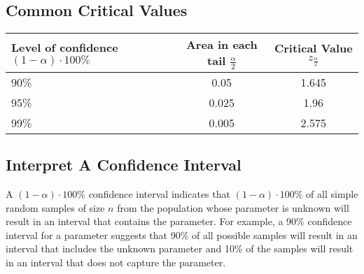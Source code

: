 \documentclass{report}
\begin{document}
        \bigbreak \noindent \bigbreak \noindent 
        \subsection*{Common Critical Values}
        \bigbreak \noindent 
                \begin{center}
            \begin{tabular}{|l|c|c|}
            \hline
            Level of confidence $(1-\alpha) \cdot 100\%$ & Area in each tail $\frac{\alpha}{2}$ & Critical Value $z_{\frac{\alpha}{2}}$ \\
            	\hline
            90\% & 0.05 & 1.645   \\
            	\hline
            95\% & 0.025 & 1.96 \\
            \hline 
            99\% & 0.005 & 2.575 \\
            \hline
            \end{tabular}
        \end{center}

        \bigbreak \noindent \bigbreak \noindent 
        \subsection*{Interpret A Confidence Interval }
        \bigbreak \noindent 
        \bigbreak \noindent 
        A $(1-\alpha)\cdot 100\%$ confidence interval indicates that $(1-\alpha)\cdot 100\%$ of all simple random samples of size $n$ from the population whose parameter is unknown will result in an interval that contains the parameter.
        \bigbreak \noindent 
        For example, a 90\% confidence interval for a parameter suggests that 90\% of all possible samples will result in an interval that includes the unknown parameter and 10\% of the samples will result in an interval that does not capture the parameter.
\end{document}
